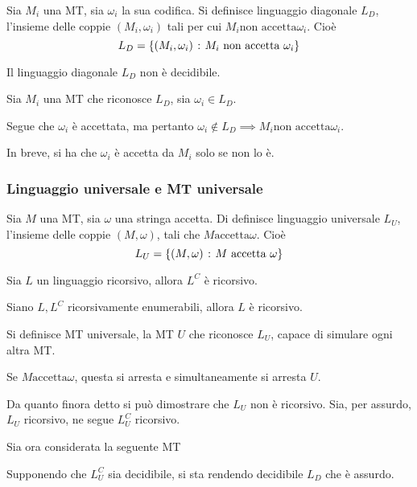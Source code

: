 \documentclass{subfiles}
\begin{document}
\begin{Definition*}
    Sia \(M_{i}\) una MT, sia \(\omega_{i}\) la sua codifica.
    Si definisce linguaggio diagonale \(L_{D}\), l'insieme delle coppie \((M_{i}, \omega_{i})\) tali per cui \(M_{i} \text{non accetta} \omega_{i}\). Cioè
    \[
        L_{D} = \set{(M_{i}, \omega_{i})}{M_{i} \text{non accetta} \omega_{i}}
    \]
\end{Definition*}
\begin{Theorem}
    Il linguaggio diagonale \(L_{D}\) non è decidibile.
    \begin{Proof*}
        Sia \(M_{i}\) una MT che riconosce \(L_{D}\), sia \(\omega_{i} \in L_{D}\).

        \noindent Segue che \(\omega_{i}\) è accettata, ma pertanto \(\omega_{i} \notin L_{D} \implies M_{i} \text{non accetta} \omega_{i}\).

        \noindent In breve, si ha che \(\omega_{i}\) è accetta da \(M_{i}\) solo se non lo è.
    \end{Proof*}
\end{Theorem}

\subsubsection{Linguaggio universale e MT universale}
\begin{Definition*}
    Sia \(M\) una MT, sia \(\omega\) una stringa accetta. Di definisce linguaggio universale \(L_{U}\), l'insieme delle coppie \((M, \omega)\), tali che \(M \text{accetta} \omega\). Cioè
    \[
        L_{U} = \set{(M, \omega)}{M \text{accetta} \omega}
    \]
\end{Definition*}
\begin{Theorem}
    Sia \(L\) un linguaggio ricorsivo, allora \(L^{C}\) è ricorsivo.
\end{Theorem}
\begin{Theorem}
    Siano \(L, L^{C}\) ricorsivamente enumerabili, allora \(L\) è ricorsivo.
\end{Theorem}
\begin{Definition*}
    Si definisce MT universale, la MT \(U\) che riconosce \(L_{U}\), capace di simulare ogni altra MT.
\end{Definition*}
\begin{Note*}\label{Note: }
    Se \(M \text{accetta} \omega\), questa si arresta e simultaneamente si arresta \(U\).
\end{Note*}

\noindent Da quanto finora detto si può dimostrare che \(L_{U}\) non è ricorsivo.
\noindent Sia, per assurdo, \(L_{U}\) ricorsivo, ne segue \(L_{U}^{C}\) ricorsivo.

\noindent Sia ora considerata la seguente MT


\noindent Supponendo che \(L_{U}^{C}\) sia decidibile, si sta rendendo decidibile \(L_{D}\) che è assurdo.
\clearpage
\end{document}
